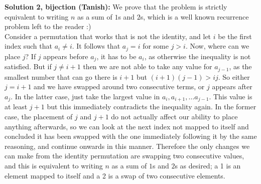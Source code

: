 \textbf{Solution 2, bijection (Tanish):} We prove that the problem is strictly equivalent to writing $n$ as a sum of $1$s and $2$s, which is a well known recurrence problem left to the reader :) \\
Consider a permutation that works that is not the identity, and let $i$ be the first index such that $a_i \neq i$. It follows that $a_j = i$ for some $j > i$. Now, where can we place $j$? If $j$ appears before $a_j$, it has to be $a_i$, as otherwise the inequality is not satisfied. But if $j \neq i+1$ then we are not able to take any value for $a_{j-1}$, as the smallest number that can go there is $i+1$ but $(i+1)(j-1) > ij$. So either $j = i+1$ and we have swapped around two consecutive terms, or $j$ appears after $a_j$. In the latter case, just take the largest value in $a_i, a_{i+1}, \dots a_{j-1}$. This value is at least $j+1$ but this immediately contradicts the inequality again. In the former case, the placement of $j$ and $j+1$ do not actually affect our ability to place anything afterwards, so we can look at the next index not mapped to itself and concluded it has been swapped with the one immediately following it by the same reasoning, and continue onwards in this manner. Therefore the only changes we can make from the identity permutation are swapping two consecutive values, and this is equivalent to writing $n$ as a sum of $1$s and $2$s as desired; a 1 is an element mapped to itself and a 2 is a swap of two consecutive elements. 

\bigskip 

